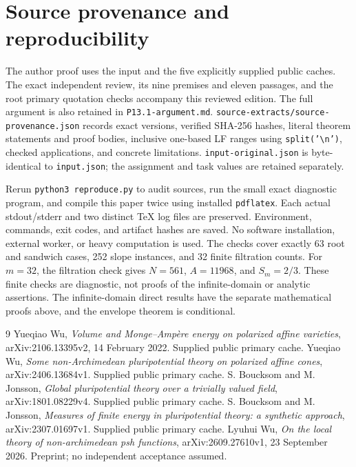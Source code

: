 \documentclass[11pt]{article}
\begin{document}
\section{Source provenance and reproducibility}
The author proof uses the input and the five explicitly supplied public caches. The exact independent review, its nine premises and eleven passages, and the root primary quotation checks accompany this reviewed edition.
The full argument is also retained in \texttt{P13.1-argument.md}.
\texttt{source-extracts/source-provenance.json} records exact versions, verified SHA-256 hashes, literal theorem statements and proof bodies, inclusive one-based LF ranges using \texttt{split('\textbackslash n')}, checked applications, and concrete limitations.
\texttt{input-original.json} is byte-identical to \texttt{input.json}; the assignment and task values are retained separately.

Rerun \texttt{python3 reproduce.py} to audit sources, run the small exact diagnostic program, and compile this paper twice using installed \texttt{pdflatex}.
Each actual stdout/stderr and two distinct TeX log files are preserved.
Environment, commands, exit codes, and artifact hashes are saved.
No software installation, external worker, or heavy computation is used.
The checks cover exactly 63 root and sandwich cases, 252 slope instances, and 32 finite filtration counts.
For $m=32$, the filtration check gives $N=561$, $A=11968$, and $S_m=2/3$.
These finite checks are diagnostic, not proofs of the infinite-domain or analytic assertions.
The infinite-domain direct results have the separate mathematical proofs above, and the envelope theorem is conditional.

\begin{thebibliography}{9}
 Yueqiao Wu, \emph{Volume and Monge--Amp\`ere energy on polarized affine varieties}, arXiv:2106.13395v2, 14 February 2022. Supplied public primary cache.
 Yueqiao Wu, \emph{Some non-Archimedean pluripotential theory on polarized affine cones}, arXiv:2406.13684v1. Supplied public primary cache.
 S. Boucksom and M. Jonsson, \emph{Global pluripotential theory over a trivially valued field}, arXiv:1801.08229v4. Supplied public primary cache.
 S. Boucksom and M. Jonsson, \emph{Measures of finite energy in pluripotential theory: a synthetic approach}, arXiv:2307.01697v1. Supplied public primary cache.
 Lyuhui Wu, \emph{On the local theory of non-archimedean psh functions}, arXiv:2609.27610v1, 23 September 2026. Preprint; no independent acceptance assumed.
\end{thebibliography}
\end{document}
